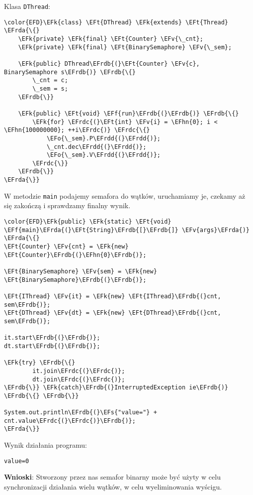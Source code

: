 \documentclass[11pt]{article}
\newcommand{\EFs}[1]{\textcolor{EFs}{#1}} %
\newcommand{\EFk}[1]{\textcolor{EFk}{#1}} %
\newcommand{\EFf}[1]{\textcolor{EFf}{#1}} %
\newcommand{\EFv}[1]{\textcolor{EFv}{#1}} %
\newcommand{\EFt}[1]{\textcolor{EFt}{#1}} %
\newcommand{\EFo}[1]{\textcolor{EFo}{#1}} %
\newcommand{\EFhn}[1]{\textcolor{EFhn}{#1}} %
\newcommand{\EFrda}[1]{#1} %
\newcommand{\EFrdb}[1]{\textcolor{EFrdb}{#1}} %
\newcommand{\EFrdc}[1]{\textcolor{EFrdc}{#1}} %
\newcommand{\EFrdd}[1]{\textcolor{EFrdd}{#1}} %
\begin{document}
Klasa \texttt{DThread}:
\begin{Code}
\begin{Verbatim}
\color{EFD}\EFk{class} \EFt{DThread} \EFk{extends} \EFt{Thread} \EFrda{\{}
    \EFk{private} \EFk{final} \EFt{Counter} \EFv{\_cnt};
    \EFk{private} \EFk{final} \EFt{BinarySemaphore} \EFv{\_sem};

    \EFk{public} DThread\EFrdb{(}\EFt{Counter} \EFv{c}, BinarySemaphore s\EFrdb{)} \EFrdb{\{}
        \_cnt = c;
        \_sem = s;
    \EFrdb{\}}

    \EFk{public} \EFt{void} \EFf{run}\EFrdb{(}\EFrdb{)} \EFrdb{\{}
        \EFk{for} \EFrdc{(}\EFt{int} \EFv{i} = \EFhn{0}; i < \EFhn{100000000}; ++i\EFrdc{)} \EFrdc{\{}
            \EFo{\_sem}.P\EFrdd{(}\EFrdd{)};
            \_cnt.dec\EFrdd{(}\EFrdd{)};
            \EFo{\_sem}.V\EFrdd{(}\EFrdd{)};
        \EFrdc{\}}
    \EFrdb{\}}
\EFrda{\}}
\end{Verbatim}
\end{Code}

W metodzie \texttt{main} podajemy semafora do wątków,
uruchamiamy je, czekamy aż się zakończą i sprawdzamy finalny wynik.
\begin{Code}
\begin{Verbatim}
\color{EFD}\EFk{public} \EFk{static} \EFt{void} \EFf{main}\EFrda{(}\EFt{String}\EFrdb{[}\EFrdb{]} \EFv{args}\EFrda{)} \EFrda{\{}
\EFt{Counter} \EFv{cnt} = \EFk{new} \EFt{Counter}\EFrdb{(}\EFhn{0}\EFrdb{)};

\EFt{BinarySemaphore} \EFv{sem} = \EFk{new} \EFt{BinarySemaphore}\EFrdb{(}\EFrdb{)};

\EFt{IThread} \EFv{it} = \EFk{new} \EFt{IThread}\EFrdb{(}cnt, sem\EFrdb{)};
\EFt{DThread} \EFv{dt} = \EFk{new} \EFt{DThread}\EFrdb{(}cnt, sem\EFrdb{)};

it.start\EFrdb{(}\EFrdb{)};
dt.start\EFrdb{(}\EFrdb{)};

\EFk{try} \EFrdb{\{}
        it.join\EFrdc{(}\EFrdc{)};
        dt.join\EFrdc{(}\EFrdc{)};
\EFrdb{\}} \EFk{catch}\EFrdb{(}InterruptedException ie\EFrdb{)} \EFrdb{\{} \EFrdb{\}}

System.out.println\EFrdb{(}\EFs{"value="} + cnt.value\EFrdc{(}\EFrdc{)}\EFrdb{)};
\EFrda{\}}
\end{Verbatim}
\end{Code}

Wynik działania programu:
\begin{tcolorbox}
\begin{Verbatim}
value=0
\end{Verbatim}



\end{tcolorbox}\textbf{Wnioski}: Stworzony przez nas semafor binarny może być użyty w celu synchronizacji
działania wielu wątków, w celu wyeliminowania wyścigu.
\end{document}
